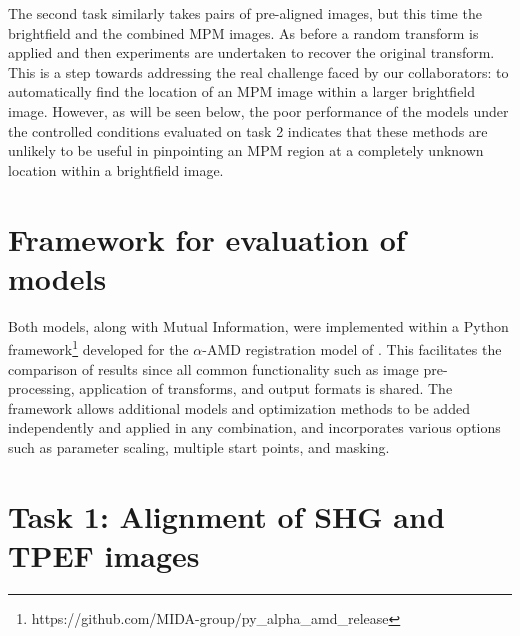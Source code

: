 \documentclass{report}
\begin{document}
The second task similarly takes pairs of pre-aligned images, but this time the brightfield and the combined MPM images. As before a random transform is applied and then experiments are undertaken to recover the original transform. This is a step towards addressing the real challenge faced by our collaborators: to automatically find the location of an MPM image within a larger brightfield image. However, as will be seen below, the poor performance of the models under the controlled conditions evaluated on task 2 indicates that these methods are unlikely to be useful in pinpointing an MPM region at a completely unknown location within a brightfield image.

\section{Framework for evaluation of models}
Both models, along with Mutual Information, were implemented within a Python framework\footnote{https://github.com/MIDA-group/py\_alpha\_amd\_release}
developed for the $\alpha$-AMD registration model of \cite{ofverstedt2019fast}. This facilitates the comparison of results since all common functionality such as image pre-processing, application of transforms, and output formats is shared. The framework allows additional models and optimization methods to be added independently and applied in any combination, and incorporates various options such as parameter scaling, multiple start points, and masking.
\section{Task 1: Alignment of SHG and TPEF images}
\label{sec:eval_shg_tpef}
\end{document}

